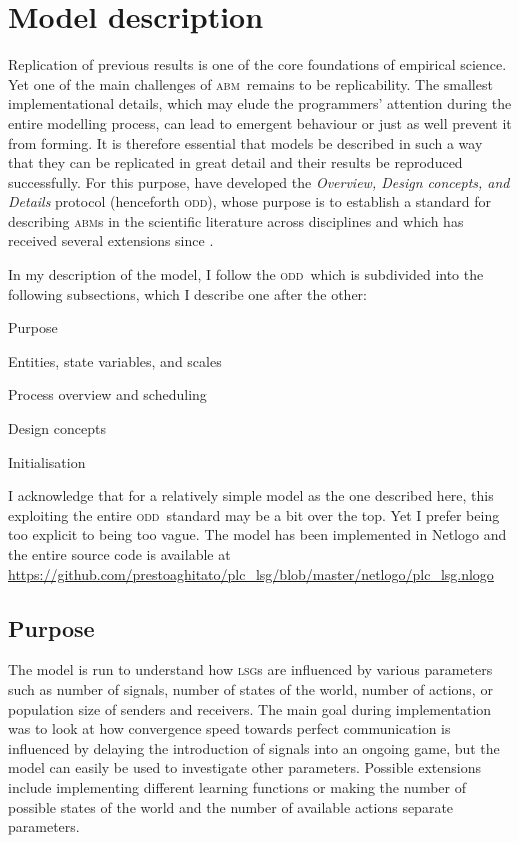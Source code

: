 \documentclass[
	DIV=calc,
	BCOR=0mm,
	pagesize,
	titlepage
]{scrartcl}
\newcommand{\abm}{\textsc{abm}}
\newcommand{\lsg}{\textsc{lsg}}
\newcommand{\odd}{\textsc{odd}}
\begin{document}
\section{Model description}
\label{sec:mod}
Replication of previous results is one of the core foundations of empirical science.
Yet one of the main challenges of \abm\ remains to be replicability.
The smallest implementational details, which may elude the programmers' attention during the entire modelling process, can lead to emergent behaviour or just as well prevent it from forming.
It is therefore essential that models be described in such a way that they can be replicated in great detail and their results be reproduced successfully.
For this purpose, \citet{grimm_standard_2006, grimm_odd_2010} have developed the \emph{Overview, Design concepts, and Details} protocol (henceforth \odd), whose purpose is to establish a standard for describing \abm s in the scientific literature across disciplines and which has received several extensions since \citep[e.g.][for models involving human decision making]{muller_describing_2013}.

In my description of the model, I follow the \odd\, which is subdivided into the following subsections, which I describe one after the other:
\begin{enumerate*}
	\item Purpose
	\item Entities, state variables, and scales
	\item Process overview and scheduling
	\item Design concepts
	\item Initialisation
\end{enumerate*}
I acknowledge that for a relatively simple model as the one described here, this exploiting the entire \odd\ standard may be a bit over the top.
Yet I prefer being too explicit to being too vague.
The model has been implemented in Netlogo \citep{wilensky_netlogo_1999} and the entire source code is available at
\url{https://github.com/prestoaghitato/plc_lsg/blob/master/netlogo/plc_lsg.nlogo}

\subsection{Purpose}
\label{ssec:modpur}
The model is run to understand how \lsg s are influenced by various parameters such as number of signals, number of states of the world, number of actions, or population size of senders and receivers.
The main goal during implementation was to look at how convergence speed towards perfect communication is influenced by delaying the introduction of signals into an ongoing game, but the model can easily be used to investigate other parameters.
Possible extensions include implementing different learning functions or making the number of possible states of the world and the number of available actions separate parameters.
\end{document}
